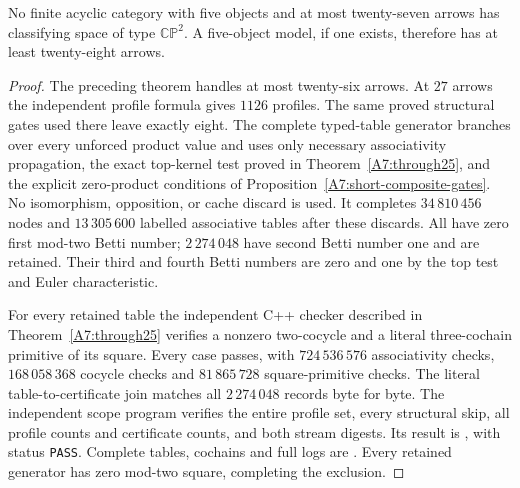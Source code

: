 \begin{theorem}\label{A7:through27}
No finite acyclic category with five objects and at most twenty-seven
arrows has classifying space of type $\mathbb{CP}^2$. A five-object
model, if one exists, therefore has at least twenty-eight arrows.
\end{theorem}
\begin{proof}
The preceding theorem handles at most twenty-six arrows. At
$27$ arrows the independent profile formula gives $1126$ profiles.
The same proved structural gates used there leave exactly eight.
The complete typed-table generator
 branches over every
unforced product value and uses only necessary associativity
propagation, the exact top-kernel test proved in
Theorem~\ref{A7:through25}, and the explicit zero-product
conditions of Proposition~\ref{A7:short-composite-gates}.
No isomorphism, opposition, or cache discard is used.
It completes $34\,810\,456$ nodes and $13\,305\,600$
labelled associative tables after these discards. All have zero
first mod-two Betti number; $2\,274\,048$ have second Betti
number one and are retained. Their third and fourth Betti numbers
are zero and one by the top test and Euler characteristic.

For every retained table the independent C++ checker described
in Theorem~\ref{A7:through25} verifies a nonzero two-cocycle
and a literal three-cochain primitive of its square. Every case
passes, with $724\,536\,576$ associativity checks,
$168\,058\,368$ cocycle checks and $81\,865\,728$
square-primitive checks. The literal table-to-certificate join
matches all $2\,274\,048$ records byte for byte. The independent
scope program verifies the entire profile set, every structural
skip, all profile counts and certificate counts, and both stream
digests. Its result is
, with status
\texttt{PASS}. Complete tables, cochains and full logs are
. Every retained generator
has zero mod-two square, completing the exclusion.
\end{proof}

